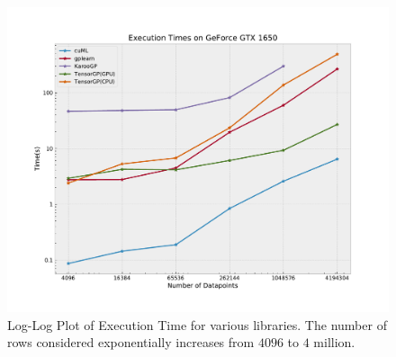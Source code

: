 \begin{figure}[htbp]
  \centering
  \includegraphics[scale=0.55]{images/ExecutionTimes.pdf}
  \caption{Log-Log Plot of Execution Time for various libraries. The number of rows considered exponentially increases from $4096$ to $4$ million.}
  \label{fig:exectimes}
\end{figure}

